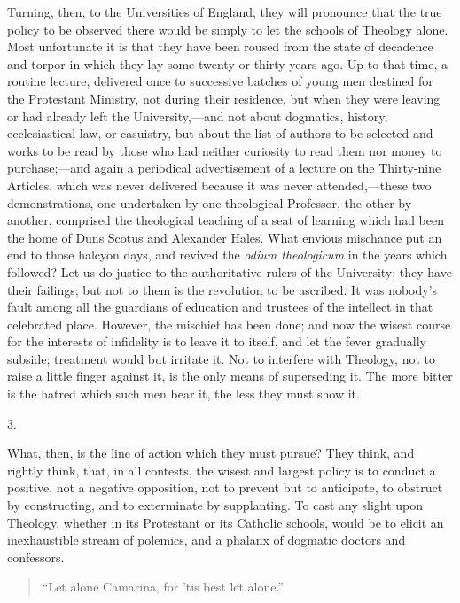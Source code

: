 Turning, then, to the Universities of England, they will pronounce
that the true policy to be observed there would be simply to let the
schools of Theology alone. Most unfortunate it is that they have been
roused from the state of decadence and torpor in which they lay some
twenty or thirty years ago. Up to that time, a routine lecture,
delivered once to successive batches of young men destined for the
Protestant Ministry, not during their residence, but when they were
leaving or had already left the University,—and not about dogmatics,
history, ecclesiastical law, or casuistry, but about the list of
authors to be selected and works to be read by those who had neither
curiosity to read them nor money to purchase;—and again a periodical
advertisement of a lecture on the Thirty-nine Articles, which was
never delivered because it was never attended,—these two
demonstrations, one undertaken by one theological Professor, the other
by another, comprised the theological teaching of a seat of learning
which had been the home of Duns Scotus and Alexander Hales. What
envious mischance put an end to those halcyon days, and revived the \emph{odium
theologicum} in the years which followed? Let us do justice to the
authoritative rulers of the University; they have their failings; but
not to them is the revolution to be ascribed. It was nobody's fault
among all the guardians of education and trustees of the intellect in
that celebrated place. However, the mischief has been done; and now
the wisest course for the interests of infidelity is to leave it to
itself, and let the fever gradually subside; treatment would but
irritate it. Not to interfere with Theology, not to raise a little
finger against it, is the only means of superseding it. The more
bitter is the hatred which such men bear it, the less they must show
it.

3.

What, then, is the line of action which they must pursue? They
think, and rightly think, that, in all contests, the wisest and
largest policy is to conduct a positive, not a negative opposition,
not to prevent but to anticipate, to obstruct by constructing, and to
exterminate by supplanting. To cast any slight upon Theology, whether
in its Protestant or its Catholic schools, would be to elicit an
inexhaustible stream of polemics, and a phalanx of dogmatic doctors
and confessors.

\begin{quote}

``Let alone Camarina, for 'tis best let alone.''

\end{quote}

